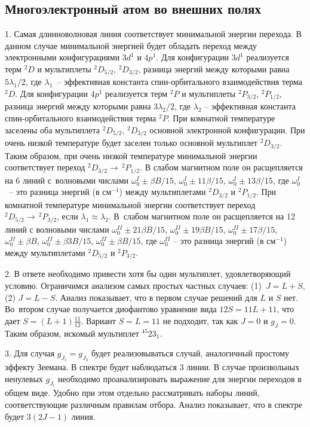 \subsection{Многоэлектронный атом во внешних полях}
1. Самая длинноволновая линия соответствует минимальной энергии перехода. В данном случае минимальной энергией будет обладать переход между электронными конфигурациями $3d^1$ и $4p^1$. Для конфигурации $3d^1$ реализуется терм $^2D$ и мультиплеты $^2D_{5/2}$, $^2D_{3/2}$, разница энергий между которыми равна $5\lambda_1/2$, где $\lambda_1$~– эффективная константа спин-орбитального взаимодействия терма $^2D$. Для конфигурации $4p^1$ реализуется терм $^2P$ и мультиплеты $^2P_{3/2}$, $^2P_{1/2}$, разница энергий между которыми равна $3\lambda_2/2$, где $\lambda_2$ – эффективная константа спин-орбитального взаимодействия терма $^2P$. При комнатной температуре заселены оба мультиплета $^2D_{5/2}$, $^2D_{3/2}$ основной электронной конфигурации. При очень низкой температуре будет заселен только основной мультиплет $^2D_{3/2}$. Таким образом, при очень низкой температуре минимальной энергии соответствует переход $^2D_{3/2} \rightarrow\, ^2P_{1/2}$. В слабом магнитном поле он расщепляется на 6 линий с~волновыми числами $\omega_{0}^I \pm \beta B/15$, $\omega_{0}^I \pm 11\beta/15$, $\omega_{0}^I \pm 13\beta/15$, где $\omega_{0}^I$~– это разница энергий (в см$^{-1}$) между мультиплетами $^2D_{3/2}$ и $^2P_{1/2}$. При комнатной температуре минимальной энергии соответствует переход $^2D_{5/2} \rightarrow\, ^2P_{3/2}$, если $\lambda_1 \approx \lambda_2$. В~слабом магнитном поле он расщепляется на 12 линий с волновыми числами $\omega_{0}^{II} \pm 21\beta B/15$, $\omega_{0}^{II} \pm 19\beta B/15$, $\omega_{0}^{II} \pm 17\beta/15$, $\omega_{0}^{II} \pm \beta B$, $\omega_{0}^{II} \pm \beta 3B/15$, $\omega_{0}^{II} \pm \beta B/15$, где $\omega_{0}^{II}$ – это разница энергий (в см$^{-1}$) между мультиплетами $^2D_{5/2}$ и $^2P_{3/2}$. \par
2. В ответе необходимо привести хотя бы один мультиплет, удовлетворяющий условию. Ограничимся анализом самых простых частных случаев: (1)~$J=L+S$, (2) $J=L-S$. Анализ показывает, что в первом случае решений для $L$ и $S$ нет. Во~втором случае получается диофантово уравнение вида $12S=11L+11$, что дает $S=(L+1)\frac{11}{12}$. Вариант $S=L=11$ не подходит, так как $J=0$ и $g_J=0$. Таким образом, искомый мультиплет $^{45}23_{1}$.\par
3. Для случая $g_{J_1} = g_{J_2}$ будет реализовываться случай, аналогичный простому эффекту Зеемана. В спектре будет наблюдаться 3 линии. В случае произвольных ненулевых $g_{J_i}$ необходимо проанализировать выражение для энергии переходов в общем виде. Удобно при этом отдельно рассматривать наборы линий, соответствующие различным правилам отбора. Анализ показывает, что в спектре будет $3(2J-1)$ линия.\par
